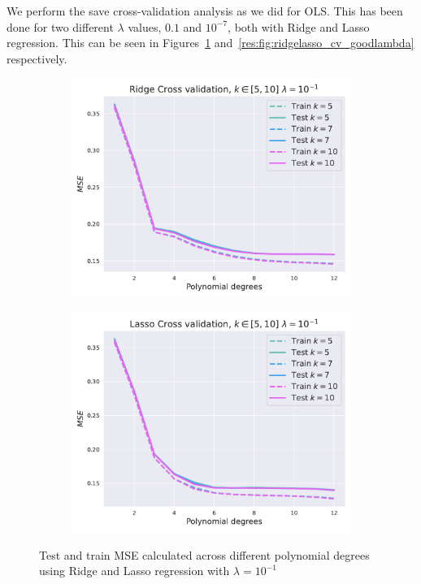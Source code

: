 \documentclass[twocolumn,english,notitlepage]{article}
\begin{document}
        We perform the save cross-validation analysis as we did for OLS. This has been done for two different $\lambda$ values, $0.1$ and $10^{-7}$, both with Ridge and Lasso regression. This can be seen in Figures~\ref{res:fig:ridgelasso_cv_badlambda} and~\ref{res:fig:ridgelasso_cv_goodlambda} respectively.
        \begin{figure}[ht]
            \begin{subfigure}{.9\linewidth}
                \centering
                \includegraphics[width=\linewidth]{bad_lmbda_Ridge_mse_kfold.pdf}
            \end{subfigure}
            \hfill
            \begin{subfigure}{.9\linewidth}
                \centering
                \includegraphics[width=\linewidth]{bad_lmbda_Lasso_mse_kfold.pdf}
            \end{subfigure}
            \caption{Test and train MSE calculated across different polynomial degrees using Ridge and Lasso regression with $\lambda = 10^{-1}$}
            \label{res:fig:ridgelasso_cv_badlambda}
        \end{figure}
\end{document}
